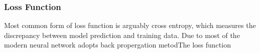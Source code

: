 \subsubsection{Loss Function}

Most common form of loss function is arguably cross entropy, which measures the discrepancy between model prediction and training data. Due to most of the modern neural network adopts back propergation metodThe loss function 